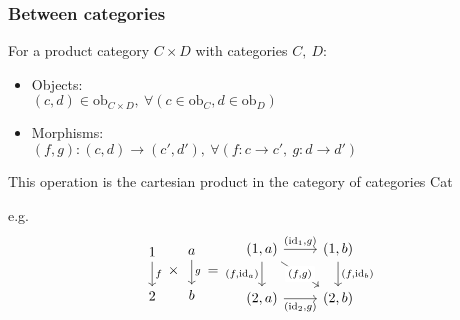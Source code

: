 \subsubsection*{Between categories}
For a product category $C\times D$ with categories $C,\ D$:
\parencite{awodey:category_theory}
\begin{itemize}
  \item Objects:\\
    $(c, d) \in \mathrm{ob}_{C\times D},\ \forall (c \in \mathrm{ob}_C, d \in \mathrm{ob}_D)$
  \item Morphisms:\\
    $(f,g) : (c,d) \to (c', d'),\ \forall (f: c \to c',\ g:d \to d')$
\end{itemize}
This operation is the cartesian product in the category of categories Cat

e.g.
\[
\begin{tikzcd}
	1 \\
	2
	\arrow["f", from=1-1, to=2-1]
\end{tikzcd}
\times
\begin{tikzcd}
	a \\
	b
	\arrow["g", from=1-1, to=2-1]
\end{tikzcd}
=
\begin{tikzcd}
	{(1,a)} & {(1,b)} \\
	{(2,a)} & {(2,b)}
	\arrow["{(\mathrm{id}_1,g)}", from=1-1, to=1-2]
	\arrow["{(f,\mathrm{id}_a)}"', from=1-1, to=2-1]
	\arrow["{(\mathrm{id}_2,g)}"', from=2-1, to=2-2]
	\arrow["{(f,\mathrm{id}_b)}", from=1-2, to=2-2]
	\arrow["{(f,g)}"{description}, from=1-1, to=2-2]
\end{tikzcd}
\]